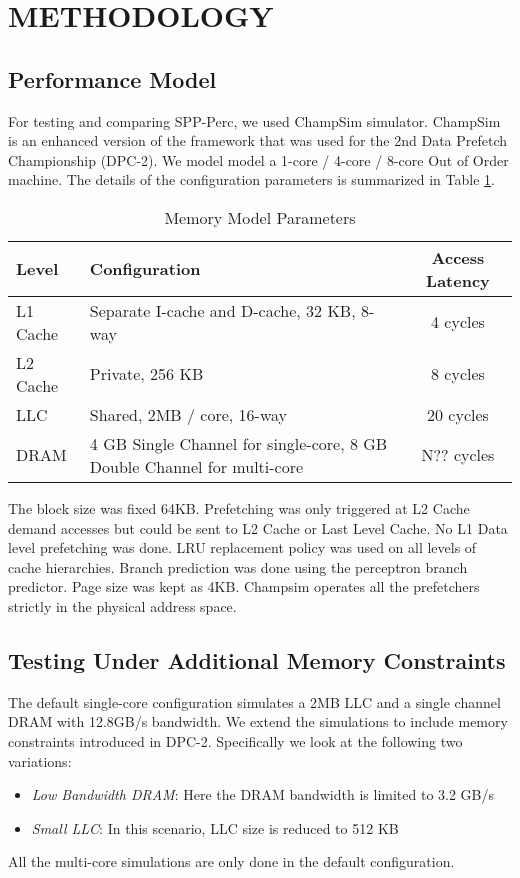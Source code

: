 
\section{METHODOLOGY}
\subsection{Performance Model}
For testing and comparing SPP-Perc, we used ChampSim\cite{Champsim}
simulator.  ChampSim is an enhanced version of the framework that was
used for the 2nd Data Prefetch Championship (DPC-2).\cite{DPC_2} We
model model a 1-core / 4-core / 8-core Out of Order machine. The
details of the configuration parameters is summarized in Table
\ref{tab:Sim_params}.

\begin{table}[]
    \centering
    \begin{tabular}{|l|p{3.6cm}|c|}
    \hline
    Level & Configuration & Access Latency \\
    \hline
         L1 Cache & Separate I-cache and D-cache, 32 KB, 8-way & 4 cycles\\
         L2 Cache & Private, 256 KB & 8 cycles\\
         LLC & Shared, 2MB / core, 16-way & 20 cycles\\
         DRAM & 4 GB Single Channel for single-core, 8 GB Double Channel for multi-core & N?? cycles\\
    \hline
    \end{tabular}
    \caption{Memory Model Parameters}
    \label{tab:Sim_params}
\end{table}

The block size was fixed 64KB. Prefetching was only triggered at L2
Cache demand accesses but could be sent to L2 Cache or Last Level
Cache.  No L1 Data level prefetching was done.  LRU replacement policy
was used on all levels of cache hierarchies.  Branch prediction was
done using the perceptron branch predictor\cite{Perc_Branch}.  Page
size was kept as 4KB.  Champsim operates all the prefetchers strictly
in the physical address space.

\subsection{Testing Under Additional Memory Constraints}
The default single-core configuration simulates a 2MB LLC and a single
channel DRAM with 12.8GB/s bandwidth.  We extend the simulations to
include memory constraints introduced in DPC-2.  Specifically we look
at the following two variations:
\begin{itemize}
\item \textit{Low Bandwidth DRAM}: Here the DRAM bandwidth is limited
  to 3.2 GB/s
\item \textit{Small LLC}: In this scenario, LLC size is reduced to 512
  KB
\end{itemize}
All the multi-core simulations are only done in the default
configuration.

